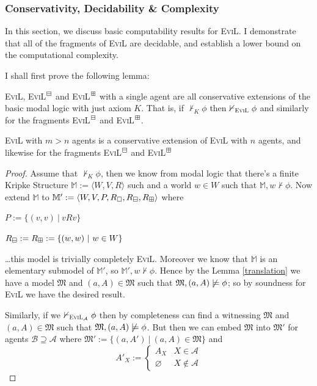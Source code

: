 \subsubsection{Conservativity, Decidability \& Complexity}

In this section, we discuss basic computability results for \textsc{EviL}. I demonstrate that all of the fragments of \textsc{EviL} are decidable, and establish a lower bound on the computational complexity.

I shall first prove the following lemma:

\begin{lemma}
\textsc{EviL}, \textsc{EviL}$^\boxminus$ and \textsc{EviL}$^\boxplus$ with a single agent are all conservative extensions of the basic modal logic with just axiom $K$.  That is, if $\nvdash_K \phi$ then $\nvdash_{\textup{\textsc{EviL}}} \phi$ and similarly for the fragments \textsc{EviL}$^\boxminus$ and \textsc{EviL}$^\boxplus$.

\textsc{EviL} with $m > n$ agents is a conservative extension of \textsc{EviL} with $n$ agents, and likewise for the fragments \textsc{EviL}$^\boxminus$ and \textsc{EviL}$^\boxplus$ 
\end{lemma}
\begin{proof}
Assume that $\nvdash_K \phi$, then we know from modal logic that there's a finite Kripke Structure $\mathbb{M} := \langle W, V, R\rangle$ such and a world $w \in W$ such that $\mathbb{M},w \nvdash \phi$.  Now extend $\mathbb{M}$ to $\mathbb{M}' := \langle W, V, P, R_\Box, R_\boxminus, R_\boxplus \rangle$ where
\begin{bul}
	\item $P := \{(v,v)\ |\ v R v\}$
	\item $R_\boxminus := R_\boxplus := \{(w,w)\ |\ w \in W\}$
\end{bul}
\ldots this model is trivially completely \textsc{EviL}. Moreover we know that $\mathbb{M}$ is an elementary submodel of $\mathbb{M}'$, so $\mathbb{M}', w\nvdash \phi$.  Hence by the Lemma \ref{translation} we have a model $\mathfrak{M}$ and $(a,A) \in \mathfrak{M}$ such that $\mathfrak{M},(a,A) \not\models \phi$; so by soundness for \textsc{EviL} we have the desired result.

Similarly, if we $\nvdash_{\textup{\textsc{EviL}}_\mathcal{A}} \phi$ then by completeness can find a witnessing $\mathfrak{M}$ and $(a,A) \in \mathfrak{M}$ such that $\mathfrak{M},(a,A) \not\models \phi$.  But then we can embed $\mathfrak{M}$ into $\mathfrak{M}'$ for agents $\mathcal{B} \supseteq \mathcal{A}$ where $\mathfrak{M}' := \{(a,A') \ |\ (a,A) \in \mathfrak{M}\}$ and
$$ A'_X := \begin{cases} A_X & X \in\mathcal{A} \\ \varnothing & X \nin \mathcal{A}\end{cases} $$
\end{proof}

